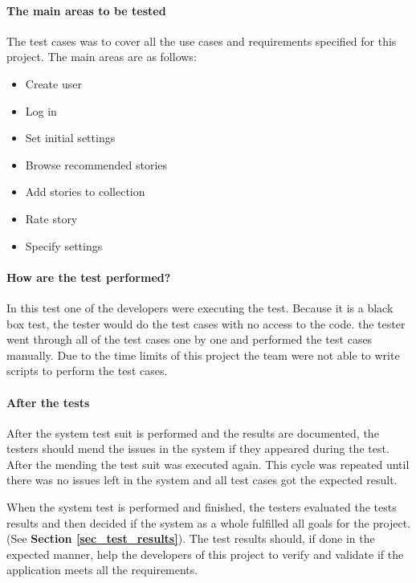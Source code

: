 {{\paragraph{The main areas to be tested}
The test cases was to cover all the use cases and requirements specified for this project. The main areas are as follows:
\begin{itemize}[noitemsep]
	\item Create user
	\item Log in
	\item Set initial settings
	\item Browse recommended stories
	\item Add stories to collection
	\item Rate story 
	\item Specify settings \newline
\end{itemize}

\paragraph{How are the test performed?}
In this test one of the developers were executing the test. Because it is a black box test, the tester would do the test cases with no access to the code. the tester went through all of the test cases one by one and performed the test cases manually. Due to the time limits of this project the team were not able to write scripts to perform the test cases. \newline

\paragraph{After the tests}
After the system test suit is performed and the results are documented, the testers should mend the issues in the system if they appeared during the test. After the mending the test suit was executed again. This cycle was repeated until there was no issues left in the system and all test cases got the expected result.\newline

When the system test is performed and finished, the testers evaluated the tests results and then decided if the system as a whole fulfilled all goals for the project.(See \textbf{Section \ref{sec_test_results}}). The test results should, if done in the expected manner, help the developers of this project to verify and validate if the application meets all the requirements.\newline

}}
